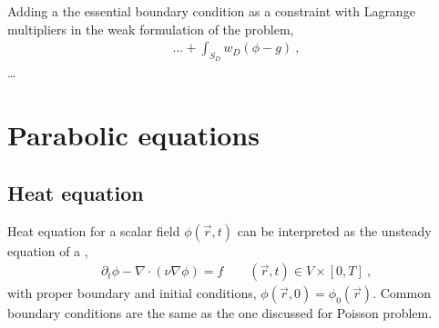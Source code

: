 \documentclass[letterpaper,10pt,english]{jupyterBook}
\begin{document}
\sphinxAtStartPar
{}

\sphinxAtStartPar
{} Adding a the essential boundary condition as a constraint with Lagrange multipliers in the weak formulation of the problem,
\begin{equation*}
\begin{split}\dots + \int_{S_D} w_D ( \phi - g ) \ ,\end{split}
\end{equation*}
\sphinxAtStartPar
…

\sphinxstepscope


\chapter{Parabolic equations}
\label{\detokenize{ch/pde/parabolic:parabolic-equations}}\label{\detokenize{ch/pde/parabolic:pde-parabolic}}\label{\detokenize{ch/pde/parabolic::doc}}

\section{Heat equation}
\label{\detokenize{ch/pde/parabolic:heat-equation}}\label{\detokenize{ch/pde/parabolic:pde-parabolic-heat}}
\sphinxAtStartPar
Heat equation for a scalar field \(\phi(\vec{r},t)\) can be interpreted as the unsteady equation of a {\hyperref[\detokenize{ch/pde/elliptic:pde-elliptic-poisson}]{}},
\begin{equation*}
\begin{split}\partial_t \phi - \nabla \cdot (\nu \nabla \phi) = f \qquad (\vec{r}, t) \in V \times [0, T] \ ,\end{split}
\end{equation*}
\sphinxAtStartPar
with proper boundary and initial conditions, \(\phi(\vec{r},0) = \phi_0(\vec{r})\). Common boundary conditions are the same as the one discussed for Poisson problem.
\end{document}
